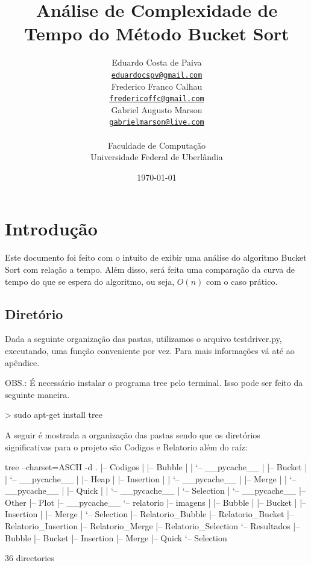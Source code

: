 \documentclass[12pt,a4paper,twoside]{report}
\title{Análise de Complexidade de Tempo do Método Bucket Sort}
\date{}
\author{Eduardo Costa de Paiva \\
\texttt{\small \url{eduardocspv@gmail.com}}\\
Frederico Franco Calhau \\
\texttt{\small \url{fredericoffc@gmail.com}}\\
Gabriel Augusto Marson \\
\texttt{\small \url{gabrielmarson@live.com}}\\
\vspace{1cm} \\
Faculdade de Computação \\
Universidade Federal de Uberlândia
}
\date{\today}
\begin{document}
  \maketitle
\listoffigures
\listoftables
\lstlistoflistings

\tableofcontents


\fancyhead[RE,LO]{\thesection}

\setlength{\parskip}{0.15in} %

\chapter{Introdução}
Este documento foi feito com o intuito de exibir uma análise do algoritmo Bucket Sort
com relação a tempo. Além disso, será feita uma comparação da curva de tempo do que se espera do
algoritmo, ou seja, $O(n)$ com o caso prático.

\section{Diretório}

Dada a seguinte organização das pastas, utilizamos o arquivo testdriver.py,  executando, uma função conveniente por vez. Para mais informações vá até ao apêndice.

OBS.: É necessário instalar o programa tree pelo terminal. Isso pode ser feito da seguinte maneira.

\begin{terminal}
> sudo apt-get install tree
\end{terminal}

A seguir é mostrada a organização das pastas sendo que os diretórios significativas para o projeto são Codigos e Relatorio além do raíz:
\begin{terminal}

tree --charset=ASCII -d
.
|-- Codigos
|   |-- Bubble
|   |   `-- __pycache__
|   |-- Bucket
|   |   `-- __pycache__
|   |-- Heap
|   |-- Insertion
|   |   `-- __pycache__
|   |-- Merge
|   |   `-- __pycache__
|   |-- Quick
|   |   `-- __pycache__
|   `-- Selection
|       `-- __pycache__
|-- Other
|-- Plot
|-- __pycache__
`-- relatorio
    |-- imagens
    |   |-- Bubble
    |   |-- Bucket
    |   |-- Insertion
    |   |-- Merge
    |   `-- Selection
    |-- Relatorio_Bubble
    |-- Relatorio_Bucket
    |-- Relatorio_Insertion
    |-- Relatorio_Merge
    |-- Relatorio_Selection
    `-- Resultados
        |-- Bubble
        |-- Bucket
        |-- Insertion
        |-- Merge
        |-- Quick
        `-- Selection

36 directories


\end{terminal}
\end{document}
